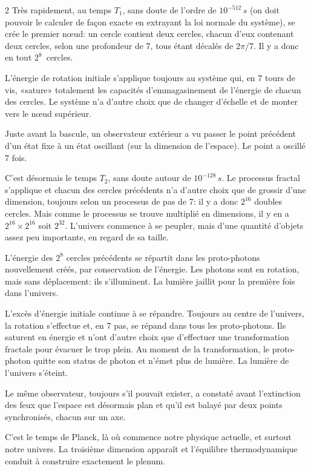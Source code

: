 \begin{multicols}{2}
Très rapidement, au temps $T_1$, sans doute de l'ordre de $10^{-512}\,s$ (on
doit pouvoir le calculer de façon exacte en extrayant la loi normale
du système), se crée le premier nœud: un cercle contient deux
cercles, chacun d'eux contenant deux cercles, selon une profondeur de 7, tous
étant décalés de $2\pi/7$. Il y a donc en tout $2^8$~cercles.

L'énergie de rotation initiale s'applique toujours au système qui, en 7
tours de vis, «sature» totalement les capacités d'emmagasinement de
l'énergie de chacun des cercles. Le système n'a d'autre choix que de
changer d'échelle et de monter vers le nœud supérieur.

Juste avant la bascule, un observateur extérieur a vu passer le point
précédent d'un état fixe à un état oscillant (sur la dimension de
l'espace). Le point a oscillé 7 fois.

C'est désormais le temps $T_2$, sans doute autour de $10^{-128}\,s$. Le
processus fractal s'applique et chacun des cercles précédents n'a
d'autre choix que de grossir d'une dimension, toujours selon un
processus de pas de 7: il y a donc $2^{16}$ doubles cercles. Mais comme le
processus se trouve multiplié en dimensions, il y en a  $2^{16} \times 2^{16}$ soit
$2^{32}$. L'univers commence à se peupler, mais d'une quantité d'objets assez 
peu importante, en regard de sa taille.

L'énergie des $2^8$ cercles précédents se répartit dans les
proto-photons nouvellement créés, par conservation de l'énergie. Les
photons sont en rotation, mais sans déplacement: ils s'illuminent. La
lumière jaillit pour la première fois dans l'univers.

L'excès d'énergie initiale continue à se répandre. Toujours au centre
de l'univers, la rotation s'effectue et, en 7 pas, se répand dans tous
les proto-photons. Ils saturent en énergie et n'ont d'autre choix que
d'effectuer une transformation fractale pour évacuer le trop plein. Au
moment de la transformation, le proto-photon quitte son status de
photon et n'émet plus de lumière. La lumière de l'univers s'éteint.

Le même observateur, toujours s'il pouvait exister, a constaté avant
l'extinction des feux que l'espace est désormais plan et qu'il est
balayé par deux points synchronisés, chacun sur un axe.

C'est le temps de Planck, là où commence notre physique actuelle, et
surtout notre univers. La troisième dimension apparaît et l'équilibre
thermodynamique conduit à construire exactement le plenum.


\end{multicols}
